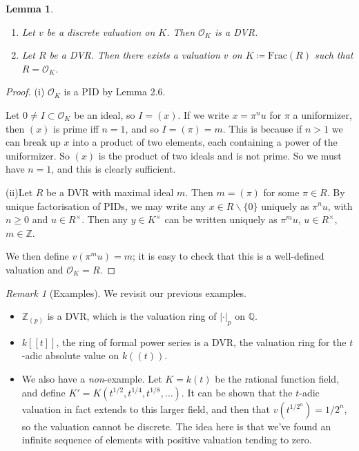 \documentclass[]{article}
\theoremstyle{custhm}
\theoremstyle{cusdef}
\theoremstyle{custhm}
\newtheorem{lemma}[theorem]{Lemma}
\theoremstyle{custhm}
\theoremstyle{custhm}
\theoremstyle{custhm}
\theoremstyle{cusdef}
\theoremstyle{remark}
\newtheorem*{remark*}{Remark}
\newcommand{\Z}{\mathbb{Z}}
\newcommand{\Q}{\mathbb{Q}}
\renewcommand{\it}[1]{\textit{#1}}
\renewcommand{\O}{\mathcal{O}}
\begin{document}
\begin{lemma}\ 
\begin{enumerate}[label = (\roman*)]
	\item Let $v$ be a discrete valuation on $K$. Then $\O_K$ is a DVR.
	\item Let $R$ be a DVR. Then there exists a valuation $v$ on $K\coloneqq \textrm{Frac}(R)$ such that $R = \O_K$.
\end{enumerate}
\end{lemma}
\begin{proof}
(i) $\O_K$ is a PID by Lemma 2.6.

Let $0\ne I \subset \O_K$ be an ideal, so $I = (x)$. If we write $x = \pi^nu$ for $\pi$ a uniformizer, then $(x)$ is prime iff $n = 1$, and so $I = (\pi) = m$. This is because if $n > 1$ we can break up $x$ into a product of two elements, each containing a power of the uniformizer. So $(x)$ is the product of two ideals and is not prime. So we must have $n = 1$, and this is clearly sufficient.

(ii)Let $R$ be a DVR with maximal ideal $m$. Then $m = (\pi)$ for some $\pi \in R$. By unique factorisation of PIDs, we may write any $x\in R\backslash \{0\}$ uniquely as $\pi^n u$, with $n\ge 0$ and $u\in R^\times$. Then any $y\in K^\times$ can be written uniquely as $\pi^mu$, $u\in R^\times$, $m\in \Z$.

We then define $v(\pi^mu) = m$; it is easy to check that this is a well-defined valuation and $\O_K = R$.
\end{proof}

\begin{remark*}[Examples]
We revisit our previous examples.
\begin{itemize}
	\item $\Z_{(p)}$ is a DVR, which is the valuation ring of $|\cdot|_p$ on $\Q$.
	\item $k[[t]]$, the ring of formal power series is a DVR, the valuation ring for the $t$-adic absolute value on $k((t))$.
	\item We also have a \it{non}-example. Let $K = k(t)$ be the rational function field, and define $K' = K(t^{1/2},t^{1/4},t^{1/8},\dots)$. It can be shown that the $t$-adic valuation in fact extends to this larger field, and then that $v(t^{1/2^n}) = 1/2^n$, so the valuation cannot be discrete. The idea here is that we've found an infinite sequence of elements with positive valuation tending to zero.
\end{itemize}
\end{remark*}
\end{document}
